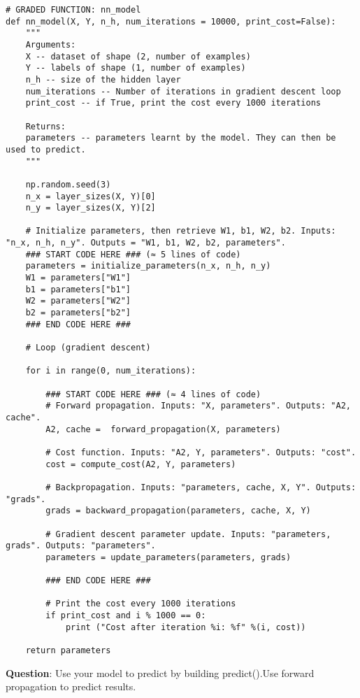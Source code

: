 \begin{verbatim}
# GRADED FUNCTION: nn_model
def nn_model(X, Y, n_h, num_iterations = 10000, print_cost=False):
    """
    Arguments:
    X -- dataset of shape (2, number of examples)
    Y -- labels of shape (1, number of examples)
    n_h -- size of the hidden layer
    num_iterations -- Number of iterations in gradient descent loop
    print_cost -- if True, print the cost every 1000 iterations
    
    Returns:
    parameters -- parameters learnt by the model. They can then be used to predict.
    """
    
    np.random.seed(3)
    n_x = layer_sizes(X, Y)[0]
    n_y = layer_sizes(X, Y)[2]
    
    # Initialize parameters, then retrieve W1, b1, W2, b2. Inputs: "n_x, n_h, n_y". Outputs = "W1, b1, W2, b2, parameters".
    ### START CODE HERE ### (≈ 5 lines of code)
    parameters = initialize_parameters(n_x, n_h, n_y)
    W1 = parameters["W1"]
    b1 = parameters["b1"]
    W2 = parameters["W2"]
    b2 = parameters["b2"]
    ### END CODE HERE ###
    
    # Loop (gradient descent)

    for i in range(0, num_iterations):
         
        ### START CODE HERE ### (≈ 4 lines of code)
        # Forward propagation. Inputs: "X, parameters". Outputs: "A2, cache".
        A2, cache =  forward_propagation(X, parameters)
        
        # Cost function. Inputs: "A2, Y, parameters". Outputs: "cost".
        cost = compute_cost(A2, Y, parameters)
 
        # Backpropagation. Inputs: "parameters, cache, X, Y". Outputs: "grads".
        grads = backward_propagation(parameters, cache, X, Y)
 
        # Gradient descent parameter update. Inputs: "parameters, grads". Outputs: "parameters".
        parameters = update_parameters(parameters, grads)
        
        ### END CODE HERE ###
        
        # Print the cost every 1000 iterations
        if print_cost and i % 1000 == 0:
            print ("Cost after iteration %i: %f" %(i, cost))

    return parameters
\end{verbatim}



{\textbf {Question}}: Use your model to predict by building predict().Use forward propagation to predict results.

